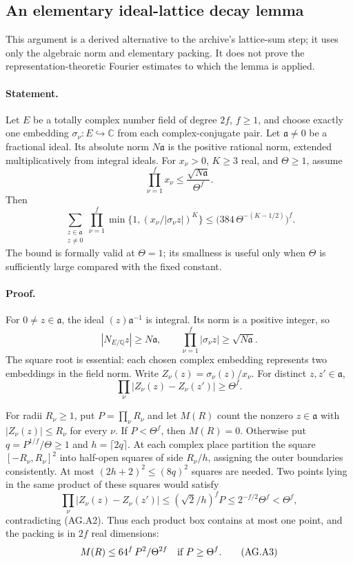 \subsection{An elementary ideal-lattice decay lemma}
\label{app:ag-lattice}

This argument is a derived alternative to the archive's
lattice-sum step; it uses only the algebraic norm and elementary
packing.  It does not prove the representation-theoretic Fourier
estimates to which the lemma is applied.

\paragraph{Statement.}
Let \(E\) be a totally complex number field of degree \(2f\),
\(f\ge1\), and choose exactly one embedding
\(\sigma_\nu:E\hookrightarrow\mathbb C\) from each complex-conjugate
pair.  Let \(\mathfrak a\ne0\) be a fractional ideal.  Its absolute
norm \(N\mathfrak a\) is the positive rational norm, extended
multiplicatively from integral ideals.  For \(x_\nu>0\), \(K\ge3\)
real, and \(\Theta\ge1\), assume
\[
 \prod_{\nu=1}^{f}x_\nu\le
        \frac{\sqrt{N\mathfrak a}}{\Theta^f}.
\]
Then
\[
 \sum_{\substack{z\in\mathfrak a\\z\ne0}}
 \prod_{\nu=1}^{f}
       \min\{1,(x_\nu/|\sigma_\nu z|)^K\}
 \le \bigl(384\,\Theta^{-(K-1/2)}\bigr)^f.                 \tag{AG.A1}
\]
The bound is formally valid at \(\Theta=1\); its smallness is
useful only when \(\Theta\) is sufficiently large compared with
the fixed constant.

\paragraph{Proof.}
For \(0\ne z\in\mathfrak a\), the ideal
\((z)\mathfrak a^{-1}\) is integral.  Its norm is a positive
integer, so
\[
 |N_{E/\mathbb Q}z|\ge N\mathfrak a,\qquad
 \prod_{\nu=1}^{f}|\sigma_\nu z|\ge\sqrt{N\mathfrak a}.
\]
The square root is essential: each chosen complex embedding
represents two embeddings in the field norm.
Write \(Z_\nu(z)=\sigma_\nu(z)/x_\nu\).
For distinct \(z,z'\in\mathfrak a\),
\[
 \prod_\nu|Z_\nu(z)-Z_\nu(z')|\ge\Theta^f.                 \tag{AG.A2}
\]

For radii \(R_\nu\ge1\), put \(P=\prod_\nu R_\nu\) and let
\(M(R)\) count the nonzero \(z\in\mathfrak a\) with
\(|Z_\nu(z)|\le R_\nu\) for every \(\nu\).
If \(P<\Theta^f\), then \(M(R)=0\).
Otherwise put \(q=P^{1/f}/\Theta\ge1\) and
\(h=\lceil2q\rceil\).
At each complex place partition the square
\([-R_\nu,R_\nu]^2\) into half-open squares of side \(R_\nu/h\),
assigning the outer boundaries consistently.
At most \((2h+2)^2\le(8q)^2\) squares are needed.
Two points lying in the same product of these squares would
satisfy
\[
 \prod_\nu|Z_\nu(z)-Z_\nu(z')|
 \le(\sqrt2/h)^fP
 \le 2^{-f/2}\Theta^f<\Theta^f,
\]
contradicting (AG.A2).  Thus each product box contains at most
one point, and the packing is in \(2f\) real dimensions:
\[
 M(R)\le64^f\,P^2/\Theta^{2f}
       \quad\hbox{if }P\ge\Theta^f.                        \tag{AG.A3}
\]

